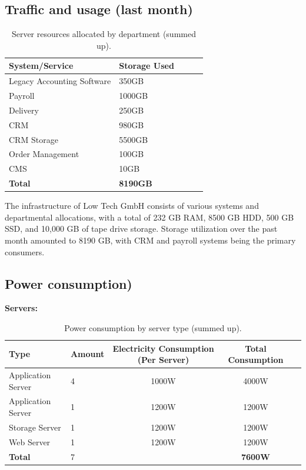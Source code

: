 \newpage
\subsection{Traffic and usage (last month)}
\label{sec:traffic}

\begin{table}[h!]
\centering
\begin{tabular}{llccc}
\toprule
\textbf{System/Service} & \textbf{Storage Used} \\
\midrule
Legacy Accounting Software & 350GB \\  
Payroll                   & 1000GB \\  
Delivery                  & 250GB \\  
CRM                       & 980GB \\  
CRM Storage               & 5500GB \\  
Order Management          & 100GB \\  
CMS                       & 10GB \\  
\midrule
\textbf{Total}            & \textbf{8190GB} \\  
\bottomrule
\end{tabular}
\caption{Server resources allocated by department (summed up).}
\label{tab:resources}
\end{table}

The infrastructure of Low Tech GmbH consists of various systems and departmental allocations, with a total of 232 GB RAM, 8500 GB HDD, 500 GB SSD, and 10,000 GB of tape drive storage. Storage utilization over the past month amounted to 8190 GB, with CRM and payroll systems being the primary consumers.

\newpage
\subsection{Power consumption)}
\label{sec:power}

\textbf{Servers:}
\begin{table}[h!]
\centering
\begin{tabular}{llccc}
\toprule
\textbf{Type} & \textbf{Amount} & \textbf{Electricity Consumption (Per Server)} & \textbf{Total Consumption} \\
\midrule
Application Server & 4 & 1000W & 4000W \\
Application Server & 1 & 1200W & 1200W \\
Storage Server     & 1 & 1200W & 1200W \\
Web Server         & 1 & 1200W & 1200W \\
\midrule
\textbf{Total}     & 7 &        & \textbf{7600W} \\
\bottomrule
\end{tabular}
\caption{Power consumption by server type (summed up).}
\label{tab:Power_server}
\end{table}


